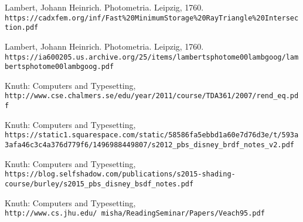 \begin{thebibliography}{9}

	Lambert, Johann Heinrich. Photometria. Leipzig, 1760.
	\\\texttt{https://cadxfem.org/inf/Fast\%20MinimumStorage\%20RayTriangle\%20Intersection.pdf}


	
	
	Lambert, Johann Heinrich. Photometria. Leipzig, 1760.
	\\\texttt{https://ia600205.us.archive.org/25/items/lambertsphotome00lambgoog/lambertsphotome00lambgoog.pdf}

	Knuth: Computers and Typesetting,
	\\\texttt{http://www.cse.chalmers.se/edu/year/2011/course/TDA361/2007/rend\_eq.pdf}
	
	Knuth: Computers and Typesetting,
	\\\texttt{https://static1.squarespace.com/static/58586fa5ebbd1a60e7d76d3e/t/593a3afa46c3c4a376d779f6/1496988449807/s2012\_pbs\_disney\_brdf\_notes\_v2.pdf}
	
	Knuth: Computers and Typesetting,
	\\\texttt{https://blog.selfshadow.com/publications/s2015-shading-course/burley/s2015\_pbs\_disney\_bsdf\_notes.pdf}
	
	Knuth: Computers and Typesetting,
	\\\texttt{http://www.cs.jhu.edu/~misha/ReadingSeminar/Papers/Veach95.pdf}
	
\end{thebibliography}











